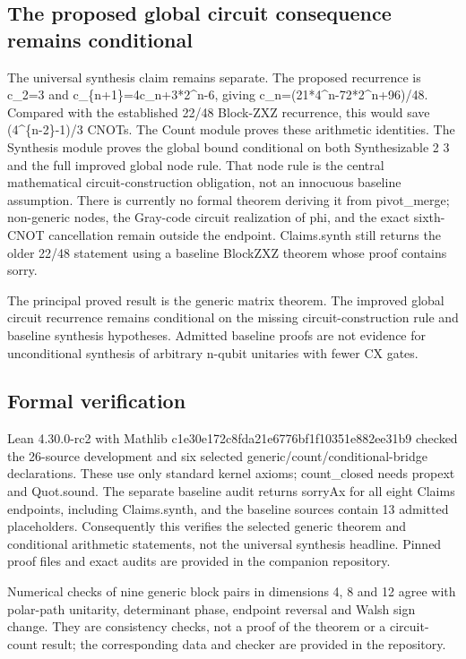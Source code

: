 \documentclass[11pt,a4paper]{article}
\begin{document}
\subsection{The proposed global circuit consequence remains conditional}
The universal synthesis claim remains separate. The proposed recurrence is c\_2=3 and c\_\{n+1\}=4c\_n+3*2\textasciicircum{}n-6, giving c\_n=(21*4\textasciicircum{}n-72*2\textasciicircum{}n+96)/48. Compared with the established 22/48 Block-ZXZ recurrence, this would save (4\textasciicircum{}\{n-2\}-1)/3 CNOTs. The Count module proves these arithmetic identities. The Synthesis module proves the global bound conditional on both Synthesizable 2 3 and the full improved global node rule. That node rule is the central mathematical circuit-construction obligation, not an innocuous baseline assumption. There is currently no formal theorem deriving it from pivot\_merge; non-generic nodes, the Gray-code circuit realization of phi, and the exact sixth-CNOT cancellation remain outside the endpoint. Claims.synth still returns the older 22/48 statement using a baseline BlockZXZ theorem whose proof contains sorry.

The principal proved result is the generic matrix theorem. The improved global circuit recurrence remains conditional on the missing circuit-construction rule and baseline synthesis hypotheses. Admitted baseline proofs are not evidence for unconditional synthesis of arbitrary n-qubit unitaries with fewer CX gates.

\subsection{Formal verification}
Lean 4.30.0-rc2 with Mathlib c1e30e172c8fda21e6776bf1f10351e882ee31b9 checked the 26-source development and six selected generic/count/conditional-bridge declarations. These use only standard kernel axioms; count\_closed needs propext and Quot.sound. The separate baseline audit returns sorryAx for all eight Claims endpoints, including Claims.synth, and the baseline sources contain 13 admitted placeholders. Consequently this verifies the selected generic theorem and conditional arithmetic statements, not the universal synthesis headline. Pinned proof files and exact audits are provided in the companion repository.

{\small Numerical checks of nine generic block pairs in dimensions 4, 8 and 12 agree with polar-path unitarity, determinant phase, endpoint reversal and Walsh sign change. They are consistency checks, not a proof of the theorem or a circuit-count result; the corresponding data and checker are provided in the repository.\par}
\end{document}
